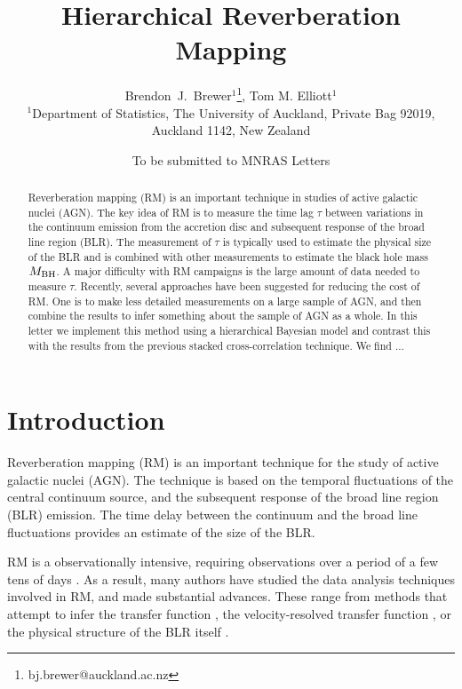 \documentclass[useAMS,usenatbib]{mn2e}
\title[Hierarchical Reverberation Mapping]
{Hierarchical Reverberation Mapping}
\author[Brewer and Elliott]{%
  Brendon~J.~Brewer$^{1}$\thanks{bj.brewer@auckland.ac.nz},
  Tom M. Elliott$^{1}$
  \medskip\\
  $^1$Department of Statistics, The University of Auckland, Private Bag 92019, Auckland 1142, New Zealand}
\begin{document}
             
\date{To be submitted to MNRAS Letters}
             
\maketitle

\label{firstpage}


\begin{abstract}
Reverberation mapping (RM) is an important technique in studies of active
galactic nuclei (AGN). The key idea of RM is to measure the time lag $\tau$
between variations in the continuum emission from the accretion disc
and subsequent response of the broad line region (BLR). The measurement of
$\tau$ is typically used to estimate the physical size of the BLR and is
combined with other measurements to estimate the black hole mass $M_{\rm BH}$.
A major difficulty with RM campaigns is the large amount of data needed to
measure $\tau$. Recently, several approaches have been suggested for reducing
the cost of RM. One is to make less detailed measurements on a large sample
of AGN, and then combine the results to infer something about the sample of
AGN as a whole. In this letter we implement this method using a hierarchical
Bayesian model and contrast this with the results from the previous stacked
cross-correlation technique. We find ...
\end{abstract}

\begin{keywords}

\end{keywords}


\section{Introduction}
Reverberation mapping (RM) is an important technique for the study
of active galactic nuclei (AGN). The technique is based on the temporal
fluctuations of the central continuum source, and the subsequent response
of the broad line region (BLR) emission. The time delay between the continuum
and the broad line fluctuations provides an estimate of the size of the BLR.

RM is a observationally intensive, requiring observations over a period of
a few tens of days \citep{2013ApJ...769..128B}. As a result, many authors have
studied the data analysis techniques involved in RM, and made substantial
advances. These range from methods that attempt to infer the
transfer function \citep[the distribution of lags in a single object,
e.g.][]{1995ApJ...440..166K, 2011ApJ...735...80Z},
the velocity-resolved transfer function
\citep{2010ApJ...720L..46B}, or the physical structure of the BLR itself
\citep{pancoast, arp151}.
\end{document}
